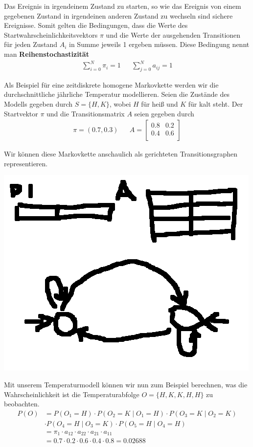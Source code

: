 Das Ereignis in irgendeinem Zustand zu starten, so wie das Ereignis von einem gegebenen Zustand in irgendeinen anderen Zustand zu wechseln sind sichere Ereignisse. Somit gelten die Bedingungen, dass die Werte des Startwahrscheinlichkeitsvektors $\pi$ und die Werte der ausgehenden Transitionen für jeden Zustand $A_i$ in Summe jeweils 1 ergeben müssen. Diese Bedingung nennt man \textbf{Reihenstochastizität}
\begin{align}
    \sum_{i = 0}^{N} \pi_i = 1 && \sum_{j = 0}^{N} a_{ij} = 1
\end{align}

Als Beispiel für eine zeitdiskrete homogene Markovkette werden wir die durchschnittliche jährliche Temperatur modellieren. Seien die Zustände des Modells gegeben durch $S=\{H, K\}$, wobei $H$ für heiß und $K$ für kalt steht. Der Startvektor $\pi$ und die Transitionsmatrix $A$ seien gegeben durch
\begin{align}
    \pi = (0.7, 0.3) && 
    A = 
    \begin{bmatrix}
        0.8 & 0.2 \\
        0.4 & 0.6 \\
    \end{bmatrix}
\end{align}

Wir können diese Markovkette anschaulich als gerichteten Transitionsgraphen representieren.

\includegraphics[scale=1.0]{images/Markov_Chain_Example.png}

Mit unserem Temperaturmodell können wir nun zum Beispiel berechnen, was die Wahrscheinlichkeit ist die Temperaturabfolge $O = \{H, K, K, H, H\}$ zu beobachten.
\begin{align*}
    P(O) & = P(O_1 = H) \cdot P(O_2 = K \mid O_1 = H) \cdot P(O_3 = K \mid O_2 = K) \\
    & \cdot P(O_4=H \mid O_3 = K) \cdot P(O_5 = H \mid O_4 = H) \\
    & = \pi_1 \cdot a_{12} \cdot a_{22} \cdot a_{21} \cdot a_{11} \\
    & = 0.7 \cdot 0.2 \cdot 0.6 \cdot 0.4 \cdot 0.8 = 0.02688
\end{align*}

